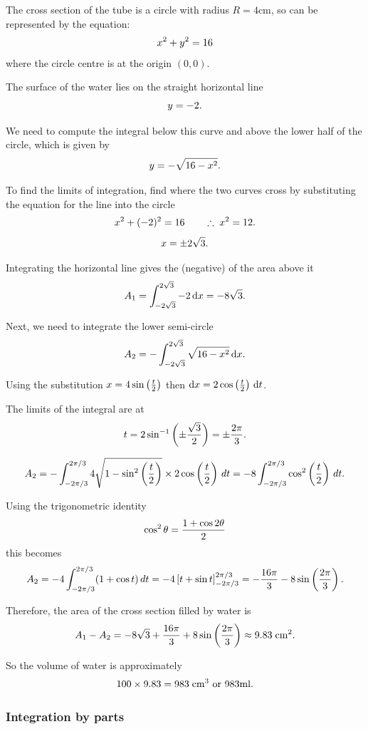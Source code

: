 \begin{solution}
The cross section of the tube is a circle with radius $R=4$cm, so can be represented by the equation:
\[
x^2+y^2=16
\]
where the circle centre is at the origin $(0,0)$.

The surface of the water lies on the straight horizontal line
\[
y=-2.
\]

We need to compute the integral below this curve and above the lower half of the circle, which is given by
\[
y=-\sqrt{16-x^2}.
\]

To find the limits of integration, find where the two curves cross by substituting the equation for the line into the circle
\[
x^2+(-2)^2=16
\qquad \therefore \;
x^2=12.
\]
\[
x=\pm2\sqrt{3}.
\]

Integrating the horizontal line gives the (negative) of the area above it
\[
A_1=\int_{-2\sqrt{3}}^{2\sqrt{3}}-2\,{\rm d}x
=-8\sqrt{3}.
\]

Next, we need to integrate the lower semi-circle
\[
A_2=-\int_{-2\sqrt{3}}^{2\sqrt{3}}\sqrt{16-x^2}\,{\rm d}x.
\]

Using the substitution $x=4\sin\left(\frac{t}{2}\right)$ then ${\rm d}x=2\cos\left(\frac{t}{2}\right)\,{\rm d}t$.

The limits of the integral are at
\[
t=2\sin^{-1}\left(\pm\frac{\sqrt{3}}{2}\right)=\pm\frac{2\pi}{3}.
\]

\[
A_2=-\int_{-2\pi/3}^{2\pi/3}4\sqrt{1-\sin^2\left(\frac{t}{2}\right)}
\times2\cos\left(\frac{t}{2}\right)\,dt
=-8\int_{-2\pi/3}^{2\pi/3}\cos^2\left(\frac{t}{2}\right)\,dt.
\]

Using the trigonometric identity
\[
\cos^2\theta=\frac{1+\cos2\theta}{2}
\]
this becomes
\[
A_2=-4\int_{-2\pi/3}^{2\pi/3}(1+\cos t)\,dt
=-4\left[t+\sin t\right]_{-2\pi/3}^{2\pi/3}
=-\frac{16\pi}{3}-8\sin\left(\frac{2\pi}{3}\right).
\]

Therefore, the area of the cross section filled by water is
\[
A_1-A_2=-8\sqrt{3}+\frac{16\pi}{3}+8\sin\left(\frac{2\pi}{3}\right)
\approx9.83\;\mathrm{cm}^2.
\]

So the volume of water is approximately
\[
100\times9.83=983\;\mathrm{cm}^3\text{ or }983\mathrm{ml}.
\]
\end{solution}

\subsubsection{Integration by parts} 

